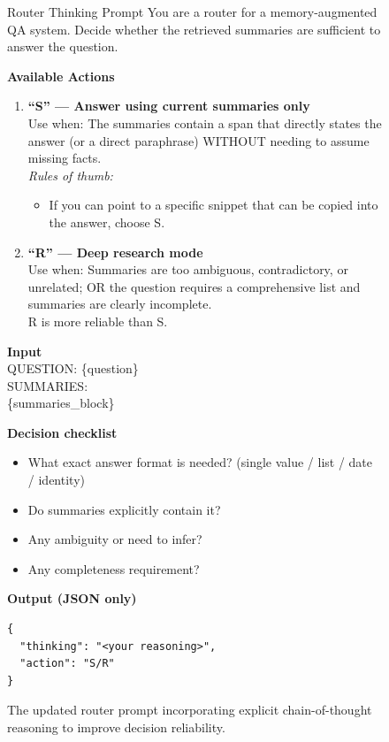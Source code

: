 \documentclass{article}
\theoremstyle{plain}
\theoremstyle{definition}
\theoremstyle{remark}
\begin{document}
\begin{figure}[htb]
\begin{AIbox}[width=\textwidth]{Router Thinking Prompt }
\footnotesize
You are a router for a memory-augmented QA system. Decide whether the retrieved summaries are sufficient to answer the question.

\textbf{Available Actions}
\begin{enumerate}
    \item \textbf{``S'' — Answer using current summaries only} \\
    Use when: The summaries contain a span that directly states the answer (or a direct paraphrase) WITHOUT needing to assume missing facts. \\
    \textit{Rules of thumb:}
    \begin{itemize}
        \item If you can point to a specific snippet that can be copied into the answer, choose S.
    \end{itemize}

    \item \textbf{``R'' — Deep research mode} \\
    Use when: Summaries are too ambiguous, contradictory, or unrelated; OR the question requires a comprehensive list and summaries are clearly incomplete. \\
    R is more reliable than S.
\end{enumerate}

\textbf{Input} \\
QUESTION: \{question\} \\
SUMMARIES: \\
\{summaries\_block\}

\textbf{Decision checklist}
\begin{itemize}
    \item What exact answer format is needed? (single value / list / date / identity)
    \item Do summaries explicitly contain it?
    \item Any ambiguity or need to infer?
    \item Any completeness requirement?
\end{itemize}

\textbf{Output (JSON only)}
\begin{verbatim}
{
  "thinking": "<your reasoning>",
  "action": "S/R"
}
\end{verbatim}
\end{AIbox}
\caption{The updated router prompt incorporating explicit chain-of-thought reasoning to improve decision reliability.}
\label{fig:router_prompt_v2}
\end{figure}
\end{document}
